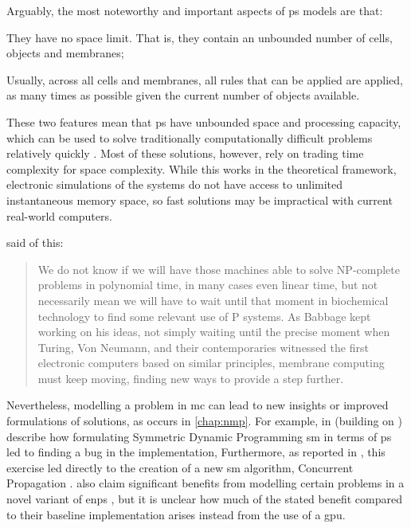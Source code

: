 Arguably, the most noteworthy and important aspects of \gls{ps} models are that:
\begin{inparaenum}[(i)]
\item They have no space limit.  That is, they contain an unbounded number of cells, objects and membranes;
\item Usually, across all cells and membranes, all rules that can be applied are applied, as many times as possible given the current number of objects available.
\end{inparaenum}
These two features mean that \gls{ps} have unbounded space and processing capacity, which can be used to solve traditionally computationally difficult problems relatively quickly \cite{Sosik2003,Jimenez2003,Paun1999a,Henderson2020}.  Most of these solutions, however, rely on trading time complexity for space complexity.  While this works in the theoretical framework, electronic simulations of the systems do not have access to unlimited instantaneous memory space, so fast solutions may be impractical with current real-world computers.

\citeauthor{Valencia-Cabrera2019} said of this:
\blockcquote[][p.~213]{Valencia-Cabrera2019}{We do not know if we will have those machines able to solve NP-complete problems in polynomial time, in many cases even linear time, but  not necessarily mean we will have to wait until that moment in biochemical technology to find some relevant use of P systems. As Babbage kept working on his ideas, not simply waiting until the precise moment when Turing, Von Neumann, and their contemporaries witnessed the first electronic computers based on similar principles, membrane computing must keep moving, finding new ways to provide a step further.}

Nevertheless, modelling a problem in \gls{mc} can lead to new insights or improved formulations of solutions, as occurs in \cref{chap:nmp}.  For example, in \cite{GimelFarb2013a} (building on \cite{Gimelfarb2011}) \citeauthor{GimelFarb2013a} describe how formulating Symmetric Dynamic Programming \gls{sm} in terms of \gls{ps} led to finding a bug in the implementation,   Furthermore, as reported in \cite{Nicolescu2014b}, this exercise led directly to the creation of a new \gls{sm} algorithm, Concurrent Propagation \cite{Gimelfarb2012}.  \citeauthor{Pang2018} \cite{Pang2018} also claim significant benefits from modelling certain problems in a novel variant of \gls{enps} \cite{Pavel2010}, but it is unclear how much of the stated benefit compared to their baseline implementation arises instead from the use of a \gls{gpu}.

